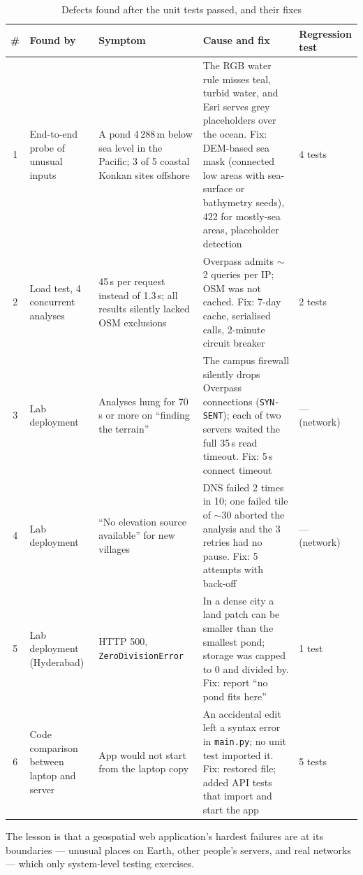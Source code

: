 \documentclass[manuscript,screen,review]{acmart}
\newcommand{\code}[1]{\texttt{\small #1}}
\begin{document}
\begin{table}[t]
  \caption{Defects found after the unit tests passed, and their fixes}
  \label{tab:defects}
  \small
  \begin{tabularx}{\linewidth}{@{}cP{3.0cm}P{3.4cm}YP{2.0cm}@{}}
    \toprule
    \# & Found by & Symptom & Cause and fix & Regression test \\
     & End-to-end probe of unusual inputs & A pond 4\,288\,m below sea level in the Pacific; 3 of 5 coastal Konkan sites offshore & The RGB water rule misses teal, turbid water, and Esri serves grey placeholders over the ocean. Fix: DEM-based sea mask (connected low areas with sea-surface or bathymetry seeds), 422 for mostly-sea areas, placeholder detection & 4 tests \\
    2 & Load test, 4 concurrent analyses & 45\,s per request instead of 1.3\,s; all results silently lacked OSM exclusions & Overpass admits $\sim$2 queries per IP; OSM was not cached. Fix: 7-day cache, serialised calls, 2-minute circuit breaker & 2 tests \\
    3 & Lab deployment & Analyses hung for 70\,s or more on ``finding the terrain'' & The campus firewall silently drops Overpass connections (\code{SYN-SENT}); each of two servers waited the full 35\,s read timeout. Fix: 5\,s connect timeout & --- (network) \\
    4 & Lab deployment & ``No elevation source available'' for new villages & DNS failed 2 times in 10; one failed tile of $\sim$30 aborted the analysis and the 3 retries had no pause. Fix: 5 attempts with back-off & --- (network) \\
    5 & Lab deployment (Hyderabad) & HTTP 500, \code{ZeroDivisionError} & In a dense city a land patch can be smaller than the smallest pond; storage was capped to 0 and divided by. Fix: report ``no pond fits here'' & 1 test \\
    6 & Code comparison between laptop and server & App would not start from the laptop copy & An accidental edit left a syntax error in \code{main.py}; no unit test imported it. Fix: restored file; added API tests that import and start the app & 5 tests \\
    \bottomrule
  \end{tabularx}
\end{table}

The lesson is that a geospatial web application's hardest failures are at its boundaries ---
unusual places on Earth, other people's servers, and real networks --- which only system-level
testing exercises.
\end{document}
